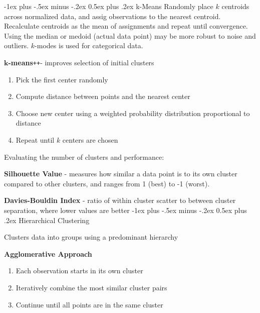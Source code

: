 \documentclass[10pt,landscape]{article}
\makeatletter
\renewcommand{\subsection}{\@startsection{subsection}{2}{0mm}%
                                {-1ex plus -.5ex minus -.2ex}%
                                {0.5ex plus .2ex}%
                                {\normalfont\normalsize\bfseries}}
\makeatother
\begin{document}
\begin{multicols}{3}
    \subsection{k-Means}
    Randomly place $k$ centroids across normalized data, and assig observations to the nearest centroid. Recalculate centroids as the mean of assignments and repeat until convergence. Using the median or medoid (actual data point) may be more robust to noise and outliers. $k$-modes is used for categorical data.

    \def\Plus{\texttt{+}}
    $\boldsymbol{k}$\textbf{-means}\Plus\Plus\hspace{1mm}- improves selection of initial clusters
    \begin{enumerate}[leftmargin=5mm]
        \itemsep -.4mm
        \item Pick the first center randomly
        \item Compute distance between points and the nearest center
        \item Choose new center using a weighted probability distribution proportional to distance
        \item Repeat until $k$ centers are chosen
    \end{enumerate}

    Evaluating the number of clusters and performance:

    \textbf{Silhouette Value} - measures how similar a data point is to its own cluster compared to other clusters, and ranges from 1 (best) to -1 (worst).

    \textbf{Davies-Bouldin Index} - ratio of within cluster scatter to between cluster separation, where lower values are better
    \subsection{Hierarchical Clustering}

    Clusters data into groups using a predominant hierarchy

    \textbf{Agglomerative Approach}
    \begin{enumerate}[leftmargin=5mm]
        \itemsep -.4mm
        \item Each observation starts in its own cluster
        \item Iteratively combine the most similar cluster pairs
        \item Continue until all points are in the same cluster
    \end{enumerate}


\end{multicols}
\end{document}
